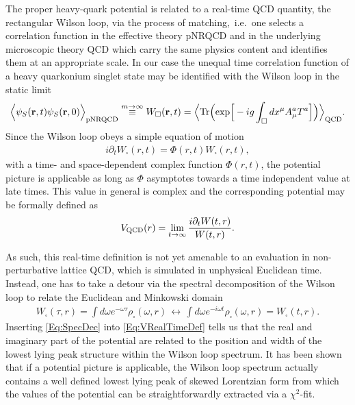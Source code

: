 The proper heavy-quark potential is related to a real-time QCD quantity, the rectangular Wilson loop, via the process of matching,~i.e.~one selects a correlation function in the effective theory pNRQCD and in the underlying microscopic theory QCD which carry the same physics content and identifies them at an appropriate scale. In our case the unequal time correlation function of a heavy quarkonium singlet state may be identified with the Wilson loop in the static limit
\begin{eqnarray}
\nonumber \Big\langle \psi_S({\bf r},t)\psi_S({\bf r},0) \Big\rangle_{\rm pNRQCD} \overset{m\to\infty}{\equiv}  W_\square({\bf r},t)=\Big\langle {\rm Tr} \Big( {\rm exp}\Big[-ig\int_\square dx^\mu A_\mu^aT^a\Big] \Big) \Big\rangle_{\rm QCD}.
\label{Eq:ForwProp}
\end{eqnarray}
Since the Wilson loop obeys a simple equation of motion \cite{Laine:2006ns}
\begin{align}
i\partial_tW_\square(r,t)=\Phi(r,t)W_\square(r,t),
\end{align}
with a time- and space-dependent complex function $\Phi(r,t)$,  the potential picture is applicable as long as $\Phi$ asymptotes towards a time independent value at late times. This value in general is complex and the corresponding potential may be formally defined as 
\begin{align}
V_{\rm QCD}(r)=\lim_{t\to\infty} \frac{i\partial_t W(t,r)}{W(t,r)}\label{Eq:VRealTimeDef}.
\end{align}

As such, this real-time definition is not yet amenable to an evaluation in non-perturbative lattice QCD, which is simulated in unphysical Euclidean time. Instead, one has to take a detour via the spectral decomposition of the Wilson loop to relate the Euclidean and Minkowski domain \cite{Rothkopf:2009pk,Rothkopf:2011db}
\begin{align}
 W_\square(\tau,r)=\int d\omega e^{-\omega \tau} \rho_\square(\omega,r)\,
\leftrightarrow\, \int d\omega e^{-i\omega t} \rho_\square(\omega,r)= W_\square(t,r). \label{Eq:SpecDec}
\end{align}
Inserting \eqref{Eq:SpecDec} into \eqref{Eq:VRealTimeDef} tells us that the real and imaginary part of the potential are related to the position and width of the lowest lying peak structure within the Wilson loop spectrum. It has been shown \cite{Burnier:2012az} that if a potential picture is applicable, the Wilson loop spectrum actually contains a well defined lowest lying peak of skewed Lorentzian form from which the values of the potential can be straightforwardly extracted via a $\chi^2$-fit. 

